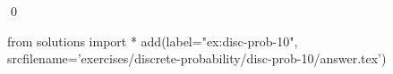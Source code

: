 
\begin{ex} 
  \label{ex:disc-prob-10}
  
  \qed
\end{ex} 
\begin{python0}
from solutions import *
add(label="ex:disc-prob-10",
    srcfilename='exercises/discrete-probability/disc-prob-10/answer.tex') 
\end{python0}
